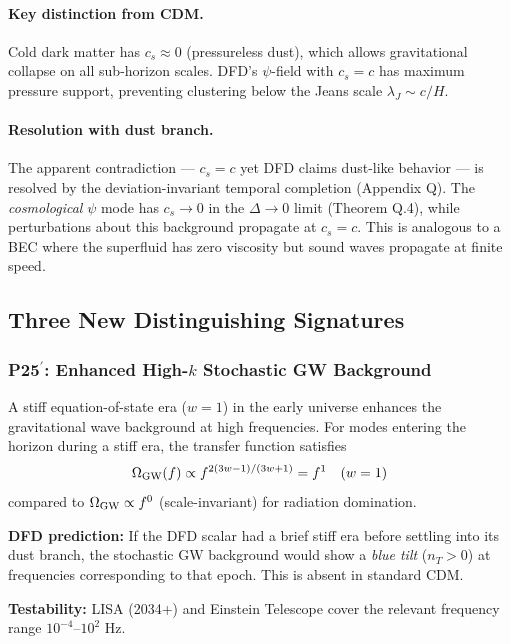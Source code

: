 \documentclass[11pt]{article}
\begin{document}
\paragraph{Key distinction from CDM.}
Cold dark matter has $c_s \approx 0$ (pressureless dust), which allows
gravitational collapse on all sub-horizon scales.  DFD's $\psi$-field
with $c_s = c$ has maximum pressure support, preventing clustering
below the Jeans scale $\lambda_J \sim c/H$.

\paragraph{Resolution with dust branch.}
The apparent contradiction --- $c_s = c$ yet DFD claims dust-like
behavior --- is resolved by the deviation-invariant temporal
completion (Appendix Q).  The \emph{cosmological} $\psi$ mode has
$c_s \to 0$ in the $\Delta \to 0$ limit (Theorem Q.4), while
perturbations about this background propagate at $c_s = c$.
This is analogous to a BEC where the superfluid has zero viscosity
but sound waves propagate at finite speed.

\subsection{Three New Distinguishing Signatures}

\subsubsection{P25$^\prime$: Enhanced High-$k$ Stochastic GW Background}

A stiff equation-of-state era ($w = 1$) in the early universe
enhances the gravitational wave background at high frequencies.
For modes entering the horizon during a stiff era, the transfer
function satisfies
\begin{equation}
\Omega_{\rm GW}(f) \propto f^{2(3w-1)/(3w+1)} = f^1 \quad (w = 1)
\end{equation}
compared to $\Omega_{\rm GW} \propto f^0$ (scale-invariant) for
radiation domination.

\textbf{DFD prediction:} If the DFD scalar had a brief stiff era
before settling into its dust branch, the stochastic GW background
would show a \emph{blue tilt} ($n_T > 0$) at frequencies
corresponding to that epoch.  This is absent in standard CDM.

\textbf{Testability:} LISA (2034+) and Einstein Telescope
cover the relevant frequency range $10^{-4}$--$10^2$ Hz.
\end{document}
